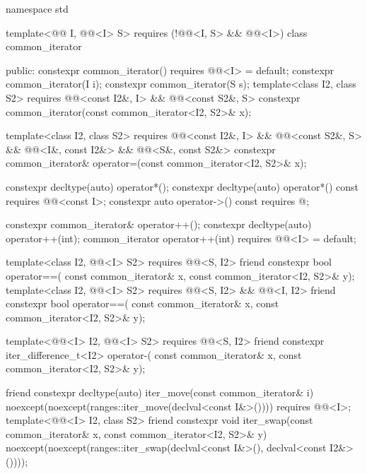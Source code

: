 %
\begin{codeblock}
namespace std {
  template<@@ I, @@<I> S>
    requires (!@@<I, S> && @@<I>)
  class common_iterator {
  public:
    constexpr common_iterator() requires @@<I> = default;
    constexpr common_iterator(I i);
    constexpr common_iterator(S s);
    template<class I2, class S2>
      requires @@<const I2&, I> && @@<const S2&, S>
        constexpr common_iterator(const common_iterator<I2, S2>& x);

    template<class I2, class S2>
      requires @@<const I2&, I> && @@<const S2&, S> &&
               @@<I&, const I2&> && @@<S&, const S2&>
        constexpr common_iterator& operator=(const common_iterator<I2, S2>& x);

    constexpr decltype(auto) operator*();
    constexpr decltype(auto) operator*() const
      requires @@<const I>;
    constexpr auto operator->() const
      requires @\seebelow@;

    constexpr common_iterator& operator++();
    constexpr decltype(auto) operator++(int);
    common_iterator operator++(int) requires @@<I> = default;

    template<class I2, @@<I> S2>
      requires @@<S, I2>
    friend constexpr bool operator==(
      const common_iterator& x, const common_iterator<I2, S2>& y);
    template<class I2, @@<I> S2>
      requires @@<S, I2> && @@<I, I2>
    friend constexpr bool operator==(
      const common_iterator& x, const common_iterator<I2, S2>& y);

    template<@@<I> I2, @@<I> S2>
      requires @@<S, I2>
    friend constexpr iter_difference_t<I2> operator-(
      const common_iterator& x, const common_iterator<I2, S2>& y);

    friend constexpr decltype(auto) iter_move(const common_iterator& i)
      noexcept(noexcept(ranges::iter_move(declval<const I&>())))
        requires @@<I>;
    template<@@<I> I2, class S2>
      friend constexpr void iter_swap(const common_iterator& x, const common_iterator<I2, S2>& y)
        noexcept(noexcept(ranges::iter_swap(declval<const I&>(), declval<const I2&>())));

}}
\end{codeblock}
